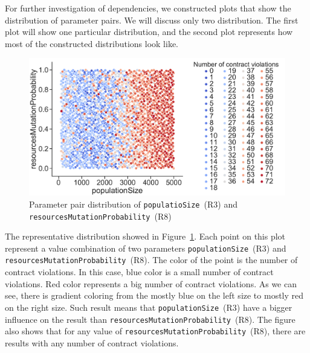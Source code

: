 For further investigation of dependencies, we constructed plots that show the distribution of parameter pairs. We will discuss only two distribution. The first plot will show one particular distribution, and the second plot represents how most of the constructed distributions look like.

\begin{figure}
	\centering
	\includegraphics[width=\textwidth]{images/populatioSizeVsResMutationProbability.pdf}
	\caption[Parameter pair distribution of \texttt{populatioSize}~(R3) and \texttt{re\-so\-ur\-ces\-Mu\-ta\-ti\-on\-Pro\-ba\-bi\-li\-ty}~(R8)]{Parameter pair distribution of \texttt{populatioSize}~(R3) and \texttt{re\-so\-ur\-ces\-Mu\-ta\-ti\-on\-Pro\-ba\-bi\-li\-ty}~(R8)}
	\label{fig:populatioSizeVsResMutationProbability}
\end{figure}

The representative distribution showed in Figure~\ref{fig:populatioSizeVsResMutationProbability}. Each point on this plot represent a value combination of two parameters \texttt{populationSize}~(R3) and \texttt{re\-so\-ur\-ces\-Mu\-ta\-ti\-on\-Pro\-ba\-bi\-li\-ty}~(R8). The color of the point is the number of contract violations. In this case, blue color is a small number of contract violations. Red color represents a big number of contract violations. As we can see, there is gradient coloring from the mostly blue on the left size to mostly red on the right size. Such result means that \texttt{po\-pu\-la\-ti\-on\-Si\-ze}~(R3) have a bigger influence on the result than \texttt{re\-so\-ur\-ces\-Mu\-ta\-ti\-on\-Pro\-ba\-bi\-li\-ty}~(R8). The figure also shows that for any value of \texttt{re\-so\-ur\-ces\-Mu\-ta\-ti\-on\-Pro\-ba\-bi\-li\-ty}~(R8), there are results with any number of contract violations.

